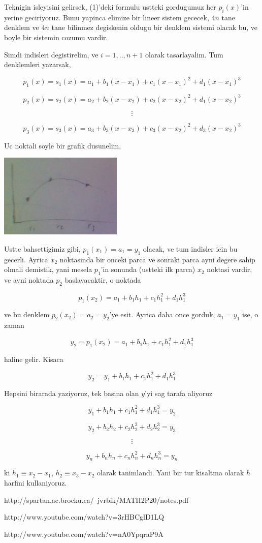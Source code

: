 \documentclass[12pt,fleqn]{article}\usepackage{common}
\begin{document}
Teknigin isleyisini gelirsek, (1)'deki formulu ustteki gordugumuz her
$p_i(x)$'in yerine geciriyoruz. Bunu yapinca elimize bir lineer sistem
gececek, $4n$ tane denklem ve $4n$ tane bilinmez degiskenin oldugu bir
denklem sistemi olacak bu, ve boyle bir sistemin cozumu vardir. 

Simdi indisleri degistirelim, ve $i=1,..,n+1$ olarak tasarlayalim. Tum
denklemleri yazarsak,

\[ p_1(x) = s_1(x) = a_1 + b_1(x-x_1) + c_1(x-x_1)^2 + d_1(x-x_1)^3\]

\[ p_2(x) = s_2(x) = a_2 + b_2(x-x_2) + c_2(x-x_2)^2 + d_1(x-x_2)^3\]

\[ \vdots \]

\[ p_3(x) = s_3(x) = a_3 + b_3(x-x_3) + c_3(x-x_2)^2 + d_3(x-x_2)^3\]

Uc noktali soyle bir grafik dusunelim,

\includegraphics[height=4cm]{spline2.png}

Ustte bahsettigimiz gibi, $p_1(x_1) = a_1 = y_1$ olacak, ve tum indisler
icin bu gecerli. Ayrica $x_2$ noktasinda bir onceki parca ve sonraki parca
ayni degere sahip olmali demistik, yani mesela $p_1$'in sonunda (ustteki
ilk parca) $x_2$ noktasi vardir, ve ayni noktada $p_2$ baslayacaktir, o
noktada 

\[ p_1(x_2) = a_1 + b_1h_1 + c_1h_1^2 + d_1h_1^3  \]

ve bu denklem $p_2(x_2) = a_2 = y_2$'ye esit. Ayrica daha once gorduk, $a_1 =
y_1$ 
ise, o zaman 

\[ y_2 = p_1(x_2) = a_1 + b_1h_1 + c_1h_1^2 + d_1h_1^3 \]

haline gelir. Kisaca

\[ y_2 =  y_1 + b_1h_1 + c_1h_1^2 + d_1h_1^3 \]

Hepsini birarada yaziyoruz, tek basina olan $y$'yi sag tarafa aliyoruz

\[ y_1 + b_1h_1 + c_1h_1^2 + d_1h_1^3 = y_2 \]

\[ y_2 + b_2h_2 + c_2h_2^2 + d_2h_2^3 = y_3 \]

\[ \vdots \]

\[ y_n + b_nh_n + c_nh_n^2 + d_nh_n^3 = y_n \]

ki $h_1 \equiv x_2 - x_1$, $h_2 \equiv x_3 - x_2$ olarak tanimlandi. Yani bir tur kisaltma 
olarak $h$ harfini kullaniyoruz. 














http://spartan.ac.brocku.ca/~jvrbik/MATH2P20/notes.pdf

http://www.youtube.com/watch?v=3rHBCglD1LQ

http://www.youtube.com/watch?v=nA0YpqraP9A
\end{document}
